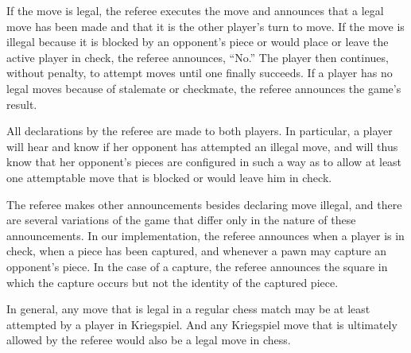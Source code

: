 \documentclass[times, 10pt,twocolumn]{article}
\begin{document}
If the move is legal, the referee executes the move and announces that a
legal move has been made and that it is the other player's turn to move.  If
the move is illegal because it is blocked by an opponent's piece or would place
or leave the active player in check, the referee announces, ``No.''  The player
then continues, without penalty, to attempt moves until one finally succeeds.
If a player has no legal moves because of stalemate or checkmate, the referee
announces the game's result.

All declarations by the referee are made to both players.  In
particular, a player will hear and know if her opponent has attempted an
illegal move, and will thus know that her opponent's pieces are configured in
such a way as to allow at least one attemptable move that is blocked or would
leave him in check.  

The referee makes other announcements besides declaring move illegal, and there
are several variations of the game that differ only in the nature of these
announcements.  In our implementation, the referee announces when a player is
in check, when a piece has been captured, and whenever a pawn may capture an
opponent's piece.  In the case of a capture, the referee announces the square
in which the capture occurs but not the identity of the captured piece.

In general, any move that is legal in a regular chess match may be at least
attempted by a player in Kriegspiel.  And any Kriegspiel move that is
ultimately allowed by the referee would also be a legal move in chess.    
\end{document}
